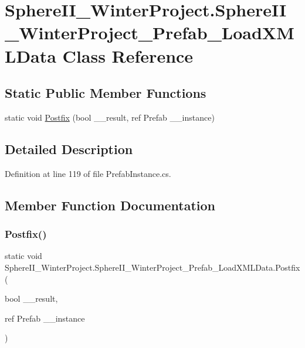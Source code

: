 \hypertarget{class_sphere_i_i___winter_project_1_1_sphere_i_i___winter_project___prefab___load_x_m_l_data}{}\section{Sphere\+I\+I\+\_\+\+Winter\+Project.\+Sphere\+I\+I\+\_\+\+Winter\+Project\+\_\+\+Prefab\+\_\+\+Load\+X\+M\+L\+Data Class Reference}
\label{class_sphere_i_i___winter_project_1_1_sphere_i_i___winter_project___prefab___load_x_m_l_data}
\subsection*{Static Public Member Functions}
\begin{DoxyCompactItemize}
\item 
static void \mbox{\hyperlink{class_sphere_i_i___winter_project_1_1_sphere_i_i___winter_project___prefab___load_x_m_l_data_a09c8b8098cc5ae39149de392499d418b}{Postfix}} (bool \+\_\+\+\_\+result, ref Prefab \+\_\+\+\_\+instance)
\end{DoxyCompactItemize}


\subsection{Detailed Description}


Definition at line 119 of file Prefab\+Instance.\+cs.



\subsection{Member Function Documentation}
\mbox{\label{class_sphere_i_i___winter_project_1_1_sphere_i_i___winter_project___prefab___load_x_m_l_data_a09c8b8098cc5ae39149de392499d418b}} 
\subsubsection{\texorpdfstring{Postfix()}{Postfix()}}
{\footnotesize\ttfamily static void Sphere\+I\+I\+\_\+\+Winter\+Project.\+Sphere\+I\+I\+\_\+\+Winter\+Project\+\_\+\+Prefab\+\_\+\+Load\+X\+M\+L\+Data.\+Postfix (\begin{DoxyParamCaption}\item[{bool}]{\+\_\+\+\_\+result,  }\item[{ref Prefab}]{\+\_\+\+\_\+instance }\end{DoxyParamCaption})\hspace{0.3cm}{\ttfamily [static]}}



